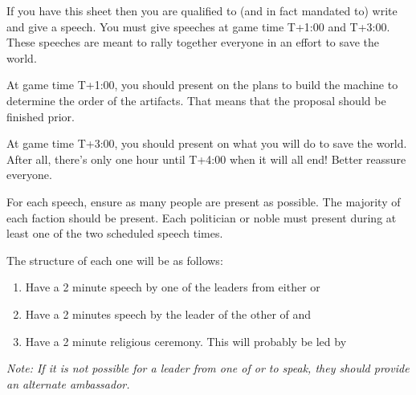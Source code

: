 \documentclass[green]{guildcamp3}
\begin{document}
	
	\name{\gSpeech{}}
	
	If you have this sheet then you are qualified to (and in fact mandated to) write and give a speech. You must give speeches at game time T+1:00 and T+3:00. These speeches are meant to rally together everyone in an effort to save the world. 
	
	At game time T+1:00, you should present on the plans to build the machine to determine the order of the artifacts. That means that the proposal should be finished prior. 
	
	
	At game time T+3:00, you should present on what you will do to save the world. After all, there's only one hour until T+4:00 when it will all end! Better reassure everyone. 
	
	For each speech, ensure as many people are present as possible. The majority of each faction should be present. Each politician or noble must present during at least one of the two scheduled speech times. 
	
	The structure of each one will be as follows:
	
	\begin{enumerate}
		\item Have a 2 minute speech by one of the leaders from either \bMagicWorld{} or \bTechWorld{}
		\item Have a 2 minutes speech by the leader of the other of \bMagicWorld{} and \bTechWorld{}
		\item Have a 2 minute religious ceremony. This will probably be led by \cPaladin{}
	\end{enumerate}	
	
	\emph{Note: If it is not possible for a leader from one of \bMagicWorld{} or \bTechWorld{} to speak, they should provide an alternate ambassador.}
\end{document}
